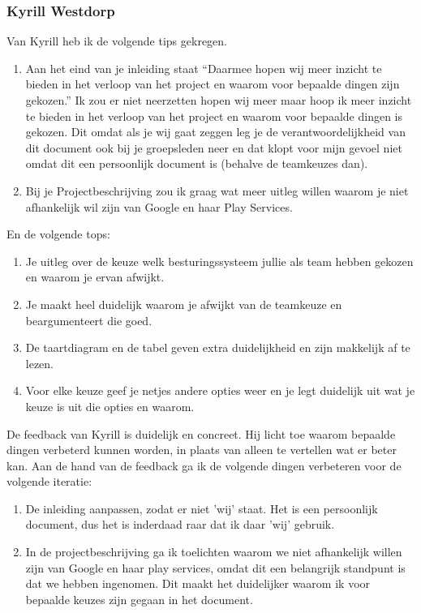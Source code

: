 \documentclass[a4paper]{report}
\begin{document}
\subsubsection{Kyrill Westdorp}
Van Kyrill heb ik de volgende tips gekregen.
\begin{enumerate}
  \item Aan het eind van je inleiding staat “Daarmee hopen wij meer inzicht te bieden in het verloop van het project en waarom voor bepaalde dingen zijn gekozen.” Ik zou er niet neerzetten hopen wij meer maar hoop ik meer inzicht te bieden in het verloop van het project en waarom voor bepaalde dingen is gekozen. Dit omdat als je wij gaat zeggen leg je de verantwoordelijkheid van dit document ook bij je groepsleden neer en dat klopt voor mijn gevoel niet omdat dit een persoonlijk document is (behalve de teamkeuzes dan).
  \item Bij je Projectbeschrijving zou ik graag wat meer uitleg willen waarom je niet afhankelijk wil zijn van Google en haar Play Services.
\end{enumerate}
En de volgende tops:
\begin{enumerate}
  \item Je uitleg over de keuze welk besturingssysteem jullie als team hebben gekozen en waarom je ervan afwijkt.
  \item Je maakt heel duidelijk waarom je afwijkt van de teamkeuze en beargumenteert die goed.
  \item De taartdiagram en de tabel geven extra duidelijkheid en zijn makkelijk af te lezen.
  \item Voor elke keuze geef je netjes andere opties weer en je legt duidelijk uit wat je keuze is uit die opties en waarom.
\end{enumerate}

De feedback van Kyrill is duidelijk en concreet. Hij licht toe waarom bepaalde dingen verbeterd kunnen worden, in plaats van alleen te vertellen wat er beter kan. 
Aan de hand van de feedback ga ik de volgende dingen verbeteren voor de volgende iteratie:
\begin{enumerate}
  \item De inleiding aanpassen, zodat er niet 'wij' staat. Het is een persoonlijk document, dus het is inderdaad raar dat ik daar 'wij' gebruik. 
  \item In de projectbeschrijving ga ik toelichten waarom we niet afhankelijk willen zijn van Google en haar play services, omdat dit een belangrijk standpunt is dat we hebben ingenomen. Dit maakt het duidelijker waarom ik voor bepaalde keuzes zijn gegaan in het document.
\end{enumerate}
\end{document}

